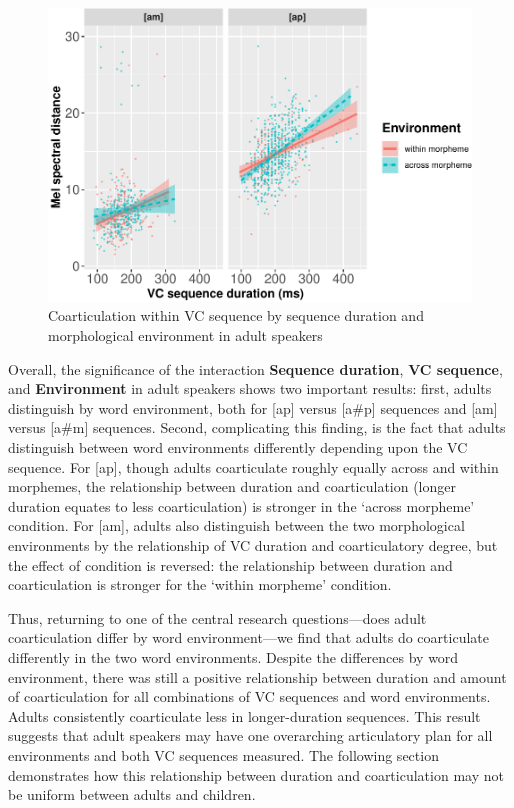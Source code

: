 \documentclass[a4paper,man,floatsintext,natbib,donotrepeattitle, apacite]{apa6}
\begin{document}
\begin{figure}[H]
\centering
\includegraphics{3_ch3_results_files/figure-latex/adult-int-plot-1.pdf}
\caption{\label{fig:adult-int-plot}Coarticulation within VC sequence by sequence duration and morphological environment in adult speakers}
\end{figure}



Overall, the significance of the interaction \textbf{Sequence duration}, \textbf{VC sequence}, and \textbf{Environment} in adult speakers shows two important results: first, adults distinguish by word environment, both for {[}ap{]} versus {[}a\#p{]} sequences and {[}am{]} versus {[}a\#m{]} sequences. Second, complicating this finding, is the fact that adults distinguish between word environments differently depending upon the VC sequence. For {[}ap{]}, though adults coarticulate roughly equally across and within morphemes, the relationship between duration and coarticulation (longer duration equates to less coarticulation) is stronger in the `across morpheme' condition. For {[}am{]}, adults also distinguish between the two morphological environments by the relationship of VC duration and coarticulatory degree, but the effect of condition is reversed: the relationship between duration and coarticulation is stronger for the `within morpheme' condition.

Thus, returning to one of the central research questions---does adult coarticulation differ by word environment---we find that adults do coarticulate differently in the two word environments. Despite the differences by word environment, there was still a positive relationship between duration and amount of coarticulation for all combinations of VC sequences and word environments. Adults consistently coarticulate less in longer-duration sequences. This result suggests that adult speakers may have one overarching articulatory plan for all environments and both VC sequences measured. The following section demonstrates how this relationship between duration and coarticulation may not be uniform between adults and children.
\end{document}
